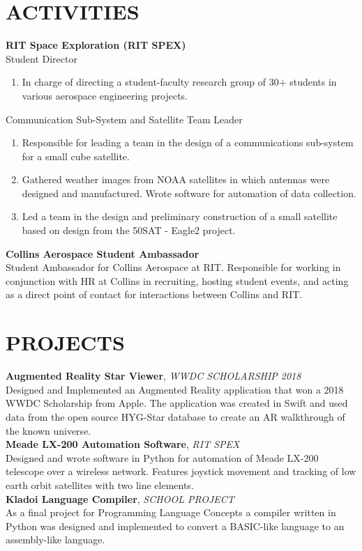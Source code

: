 \documentclass[line, resmargin]{res}
\begin{document}
\begin{resume}
\section{ACTIVITIES}
\textbf{RIT Space Exploration (RIT SPEX)}\\
Student Director
	\begin{enumerate}
		\item[]In charge of directing a student-faculty research group of 30+ students in various aerospace engineering projects. 
	\end{enumerate}
      
Communication Sub-System and  Satellite Team Leader
      \begin{enumerate}
        \item[] Responsible for leading a team in the design of a communications sub-system for a small cube satellite.
        \item[] Gathered weather images from NOAA satellites in which antennas were designed and manufactured. Wrote software for automation of data collection.
        \item[] Led a team in the design and preliminary construction of a small satellite based on design from the \textdollar 50SAT - Eagle2 project.
      \end{enumerate}
      

\textbf{Collins Aerospace Student Ambassador}\\
Student Ambassador for Collins Aerospace at RIT.  Responsible for working in conjunction with HR at Collins in recruiting, hosting student events, and acting as a direct point of contact for interactions between Collins and RIT.
      
      
\section{PROJECTS}
\textbf{Augmented Reality Star Viewer}, \textit{WWDC SCHOLARSHIP 2018}\\
Designed and Implemented an Augmented Reality application that won a 2018 WWDC Scholarship from Apple.  The application was created in Swift and used data from the open source HYG-Star database to create an AR walkthrough of the known universe.
\\ [10pt]
\textbf{Meade LX-200 Automation Software}, \textit{RIT SPEX}\\
Designed and wrote software in Python for automation of Meade LX-200 telescope over a wireless network.  Features joystick movement and tracking of low earth orbit satellites with two line elements.
\\ [10pt]
\textbf{Kladoi Language Compiler}, \textit{SCHOOL PROJECT}\\
As a final project for Programming Language Concepts a compiler written in Python was designed and implemented to convert a BASIC-like language to an assembly-like language.



\end{resume}
\end{document}
